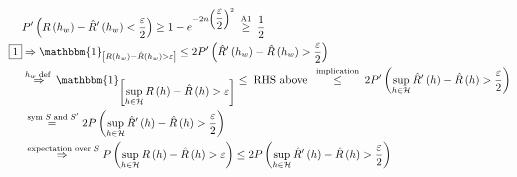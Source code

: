 \documentclass{article}
\begin{document}
\begin{align*}
&  P'\left(R\left(h_{w}\right) - \hat{R}'\left(h_{w}\right) < \dfrac{\varepsilon}{2}\right) \geq  1 - e^{- 2 n \left(\dfrac{\varepsilon}{2}\right)^{2}} \stackrel{\text{\;A1\;}}{\geq} \dfrac{1}{2}
\\ \boxed{1} &\Rightarrow  \mathbbm{1}_{\left[R\left(h_{w}\right) - \hat{R}\left(h_{w}\right) > \varepsilon\right]} \leq  2 P'\left(\hat{R}'\left(h_{w}\right) - \hat{R}\left(h_{w}\right) > \dfrac{\varepsilon}{2}\right)
\\ &\stackrel{h_{w} \text{\;def\;}}{\Rightarrow} \mathbbm{1}_{\left[\displaystyle\sup_{h \in \mathcal{H}} R\left(h\right) - \hat{R}\left(h\right) > \varepsilon\right]} \leq  \text{\;RHS above\;} \stackrel{\text{\;implication\;}}{\leq} 2 P'\left(\displaystyle\sup_{h \in \mathcal{H}} \hat{R}'\left(h\right) - \hat{R}\left(h\right) > \dfrac{\varepsilon}{2}\right)
\\ &\stackrel{\text{\;sym\;} S  \text{\;and\;} S'}{=} 2 P\left(\displaystyle\sup_{h \in \mathcal{H}} \hat{R}'\left(h\right) - \hat{R}\left(h\right) > \dfrac{\varepsilon}{2}\right)
\\ &\stackrel{\text{\;expectation over\;} S }{\Rightarrow} P\left(\displaystyle\sup_{h \in \mathcal{H}} R\left(h\right) - \hat{R}\left(h\right) > \varepsilon\right) \leq  2 P\left(\displaystyle\sup_{h \in \mathcal{H}} \hat{R}'\left(h\right) - \hat{R}\left(h\right) > \dfrac{\varepsilon}{2}\right)
\end{align*}
\end{document}
